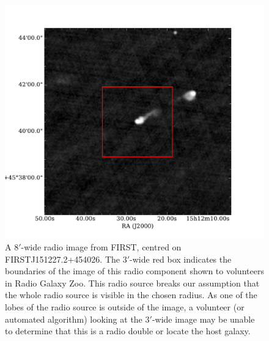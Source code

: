 \documentclass[fleqn,usenatbib,usedcolumn]{mnras}
\begin{document}
      \begin{figure}
      \centering
      \includegraphics[width=\linewidth]{images/ARG0000u0h_first_8.pdf}
      \caption{A $8'$-wide radio image from FIRST, centred on
        FIRSTJ151227.2+454026. The $3'$-wide red box indicates the boundaries of
        the image of this radio component shown to volunteers in Radio Galaxy
        Zoo. This radio source breaks our assumption that the whole radio source
        is visible in the chosen radius. As one of the lobes of the radio source
        is outside of the image, a volunteer (or automated algorithm) looking at
        the $3'$-wide image may be unable to determine that this is a radio
        double or locate the host galaxy.}
      \label{fig:broken-contains}
    \end{figure}
\end{document}
